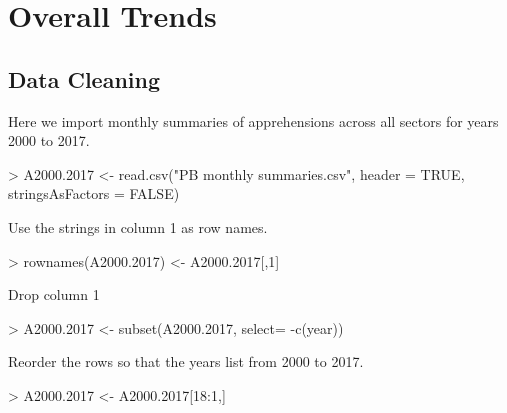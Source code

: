 \documentclass[letterpaper]{article}
\begin{document}
\section{Overall Trends}

\subsection{Data Cleaning}

Here we import monthly summaries of apprehensions across all sectors for years 2000 to 2017. 

\begin{Schunk}
\begin{Sinput}
> A2000.2017 <- read.csv("PB monthly summaries.csv", header = TRUE, stringsAsFactors = FALSE)
\end{Sinput}
\end{Schunk}

Use the strings in column 1 as row names.
\begin{Schunk}
\begin{Sinput}
> rownames(A2000.2017) <- A2000.2017[,1]
\end{Sinput}
\end{Schunk}

Drop column 1
\begin{Schunk}
\begin{Sinput}
> A2000.2017 <-  subset(A2000.2017, select= -c(year))
\end{Sinput}
\end{Schunk}

Reorder the rows so that the years list from 2000 to 2017.
\begin{Schunk}
\begin{Sinput}
> A2000.2017 <- A2000.2017[18:1,]
\end{Sinput}
\end{Schunk}
\end{document}

